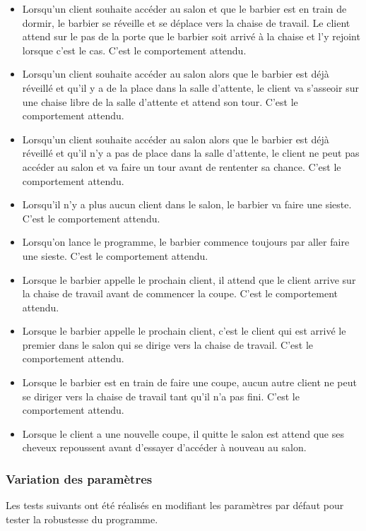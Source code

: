 \documentclass{article}
\begin{document}
\begin{itemize}
    \item Lorsqu'un client souhaite accéder au salon et que le barbier est en train de dormir, le barbier se réveille et se déplace
    vers la chaise de travail. Le client attend sur le pas de la porte que le barbier soit arrivé à la chaise et l'y rejoint lorsque
    c'est le cas. C'est le comportement attendu.
    \item Lorsqu'un client souhaite accéder au salon alors que le barbier est déjà réveillé et qu'il y a de la place dans la 
    salle d'attente, le client va s'asseoir sur une chaise libre de la salle d'attente et attend son tour. 
    C'est le comportement attendu.
    \item Lorsqu'un client souhaite accéder au salon alors que le barbier est déjà réveillé et qu'il n'y a pas de place dans la 
    salle d'attente, le client ne peut pas accéder au salon et va faire un tour avant de rententer sa chance. 
    C'est le comportement attendu.
    \item Lorsqu'il n'y a plus aucun client dans le salon, le barbier va faire une sieste. C'est le comportement attendu.
    \item Lorsqu'on lance le programme, le barbier commence toujours par aller faire une sieste. C'est le comportement attendu.
    \item Lorsque le barbier appelle le prochain client, il attend que le client arrive sur la chaise de travail avant de commencer la coupe.
    C'est le comportement attendu.
    \item Lorsque le barbier appelle le prochain client, c'est le client qui est arrivé le premier dans le salon qui se dirige vers la chaise
    de travail. C'est le comportement attendu.
    \item Lorsque le barbier est en train de faire une coupe, aucun autre client ne peut se diriger vers la chaise de travail tant 
    qu'il n'a pas fini. C'est le comportement attendu.
    \item Lorsque le client a une nouvelle coupe, il quitte le salon est attend que ses cheveux repoussent avant d'essayer d'accéder 
    à nouveau au salon.
\end{itemize}

\subsubsection*{Variation des paramètres}

Les tests suivants ont été réalisés en modifiant les paramètres par défaut pour tester la robustesse du programme.
\end{document}
